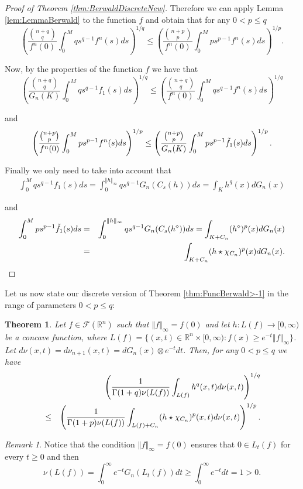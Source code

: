 \documentclass{amsart}
\newcommand{\R}{\mathbb R}
\newcommand{\norma}[1]{\left\Vert#1\right\Vert}
\newtheorem{thm}{Theorem}[section]
\theoremstyle{remark}
\newtheorem{rmk}{Remark}
\theoremstyle{definition}
\numberwithin{equation}{section}
\begin{document}
\begin{proof}[Proof of Theorem \ref{thm:BerwaldDiscreteNew}]
Therefore we can apply Lemma \ref{lem:LemmaBerwald} to the function $f$ and obtain that for any $0<p\leq q$
\[
\left( \frac{\binom{n+q}{q}}{f^n(0)} \int_0^{M} q s^{q-1} f^n(s) ds  \right)^{1/q} \leq \left( \frac{\binom{n+p}{p}}{f^n(0)} \int_0^M p s^{p-1} f^n(s) ds \right)^{1/p}.
\]

Now, by the properties of the function $f$ we have that
\[
 \left( \frac{\binom{n+q}{q}}{G_n(K)} \int_0^M q s^{q-1} f_1(s) ds  \right)^{1/q} \leq\left( \frac{\binom{n+q}{q}}{f^n(0)} \int_0^M q s^{q-1} f^n(s) ds  \right)^{1/q}
\]

and
\[
\left( \frac{\binom{n+p}{p}}{f^n(0)} \int_0^M p s^{p-1} f^n(s) ds \right)^{1/p} \leq \left( \frac{\binom{n+p}{p}}{G_n(K)} \int_0^{M} p s^{p-1} \Tilde{f_1}(s) ds \right)^{1/p}.
\]

Finally we only need to take into account that
\begin{align*}
\int_0^{M} q s^{q-1} f_1(s) ds = \int_0^{\Vert h\Vert_\infty} q s^{q-1} G_n(C_s(h)) ds = \int_{K}h^q(x)dG_n(x)
\end{align*}

and
\begin{eqnarray*}
\int_0^{M} p s^{p-1} \Tilde{f_1}(s) ds &=& \int_0^{\Vert h\Vert_\infty} q s^{q-1} G_n(C_s(h^\diamond)) ds =\int_{K+C_n}(h^\diamond)^p(x)dG_n(x)\cr
&=&\int_{K+C_n}(h\star\chi_{C_n})^p(x)dG_n(x).
\end{eqnarray*}
\end{proof}

Let us now state our discrete version of Theorem \ref{thm:FuncBerwald>-1} in the range of parameters $0<p\leq q$:

\begin{thm}\label{thm:DiscreteFunctionalBerwald}
Let $f \in \mathcal{F}(\R^n)$  such that $\norma{f}_{\infty}=f(0)$ and let  $h: L(f) \to [0, \infty)$ be a concave function, where $L(f)=\{ (x,t) \in \R^n \times [0,\infty): f(x) \geq e^{-t} \norma{f}_{\infty} \}$. Let $d\nu(x,t)=d\nu_{n+1}(x,t)=dG_n(x)\otimes e^{-t}dt$. Then, for any $0<p\leq q$ we have
\begin{eqnarray*}
&&\left( \frac{1}{\Gamma(1+q) \nu(L(f))}  \int_{L(f)} h^q(x,t) d\nu(x,t) \right)^{1/q} \cr
&\leq& \left( \frac{1}{\Gamma(1+p) \nu(L(f))}  \int_{L(f)+C_n} (h\star\chi_{C_n})^p(x,t) d\nu(x,t) \right)^{1/p}.
\end{eqnarray*}
\end{thm}

\begin{rmk}
Notice that the condition $\norma{f}_{\infty}=f(0)$ ensures that $0\in L_t(f)$ for every $t\geq0$ and then
$$
\nu(L(f))=\int_0^\infty e^{-t} G_n(L_t(f))dt\geq\int_0^\infty e^{-t}dt=1>0.
$$
\end{rmk}
\end{document}
